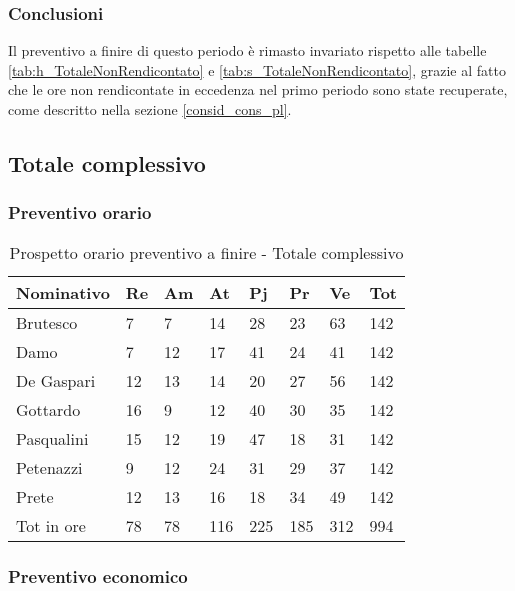 	\subsubsection{Conclusioni} Il preventivo a finire di questo periodo è rimasto invariato rispetto alle tabelle \ref{tab:h_TotaleNonRendicontato} e \ref{tab:s_TotaleNonRendicontato}, grazie al fatto che le ore non rendicontate in eccedenza nel primo periodo sono state recuperate, come descritto nella sezione \ref{consid_cons_pl}.

	\newpage
	\subsection{Totale complessivo}
		\subsubsection{Preventivo orario}
					\begin{table}[H] \begin{center} \begin{tabular}{llllllll}
					\toprule
					\textbf{Nominativo}	&	\textbf{Re}	&	\textbf{Am}	&	\textbf{At}	&	\textbf{Pj}	&	\textbf{Pr}	&	\textbf{Ve}	&	\textbf{Tot}	 \\
					\midrule
					Brutesco	&	7	&	7	&	14	&	28	&	23	&	63	&	142	 \\
					Damo	&	7	&	12	&	17	&	41	&	24	&	41	&	142	 \\
					De Gaspari	&	12	&	13	&	14	&	20	&	27	&	56	&	142	 \\
					Gottardo	&	16	&	9	&	12	&	40	&	30	&	35	&	142	 \\
					Pasqualini	&	15	&	12	&	19	&	47	&	18	&	31	&	142	 \\
					Petenazzi	&	9	&	12	&	24	&	31	&	29	&	37	&	142	 \\
					Prete	&	12	&	13	&	16	&	18	&	34	&	49	&	142	 \\
					\midrule
					Tot in ore	&	78	&	78	&	116	&	225	&	185	&	312	&	994	 \\
					\end{tabular} \end{center} \caption{Prospetto orario preventivo a finire -
					Totale complessivo
					} \end{table}
		\subsubsection{Preventivo economico}

